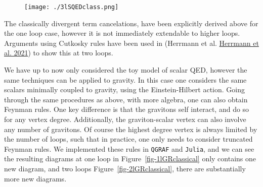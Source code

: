 \documentclass[
  11pt,
  a4paper,
  DIV=11,
  numbers=noendperiod,
  oneside]{scrreprt}
\DeclareRobustCommand{\[}{\begin{equation}}
\DeclareRobustCommand{\]}{\end{equation}}
\begin{document}
\begin{figure}


{\centering \texttt{[image: ./3lSQEDclass.png]}

}

\end{figure}

The classically divergent term cancelations, have been explicitly
derived above for the one loop case, however it is not immediately
extendable to higher loops. Arguments using Cutkosky rules have been
used in (Herrmann et al.
\protect\hyperlink{ref-Herrmann:2021tct}{Herrmann et al. 2021}) to show
this at two loops.

We have up to now only considered the toy model of scalar QED, however
the same techniques can be applied to gravity. In this case one
considers the same scalars minimally coupled to gravity, using the
Einstein-Hilbert action. Going through the same procedures as above,
with more algebra, one can also obtain Feynman rules. One key difference
is that the gravitons self interact, and do so for any vertex degree.
Additionally, the graviton-scalar vertex can also involve any number of
gravitons. Of course the highest degree vertex is always limited by the
number of loops, such that in practice, one only needs to consider
truncated Feynman rules. We implemented these rules in \texttt{QGRAF}
and \texttt{Julia}, and we can see the resulting diagrams at one loop in
Figure~\ref{fig-1lGRclassical} only contains one new diagram, and two
loops Figure~\ref{fig-2lGRclassical}, there are substantially more new
diagrams.
\end{document}
